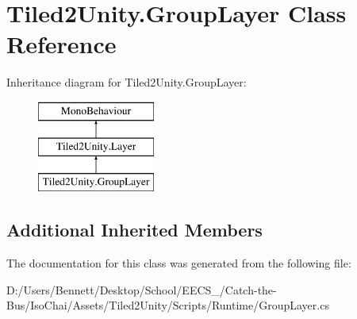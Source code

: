 \hypertarget{class_tiled2_unity_1_1_group_layer}{}\section{Tiled2\+Unity.\+Group\+Layer Class Reference}
\label{class_tiled2_unity_1_1_group_layer}
Inheritance diagram for Tiled2\+Unity.\+Group\+Layer\+:\begin{figure}[H]
\begin{center}
\leavevmode
\includegraphics[height=3.000000cm]{class_tiled2_unity_1_1_group_layer}
\end{center}
\end{figure}
\subsection*{Additional Inherited Members}


The documentation for this class was generated from the following file\+:\begin{DoxyCompactItemize}
\item 
D\+:/\+Users/\+Bennett/\+Desktop/\+School/\+E\+E\+C\+S\+\_/\+Catch-\/the-\/\+Bus/\+Iso\+Chai/\+Assets/\+Tiled2\+Unity/\+Scripts/\+Runtime/Group\+Layer.\+cs\end{DoxyCompactItemize}
